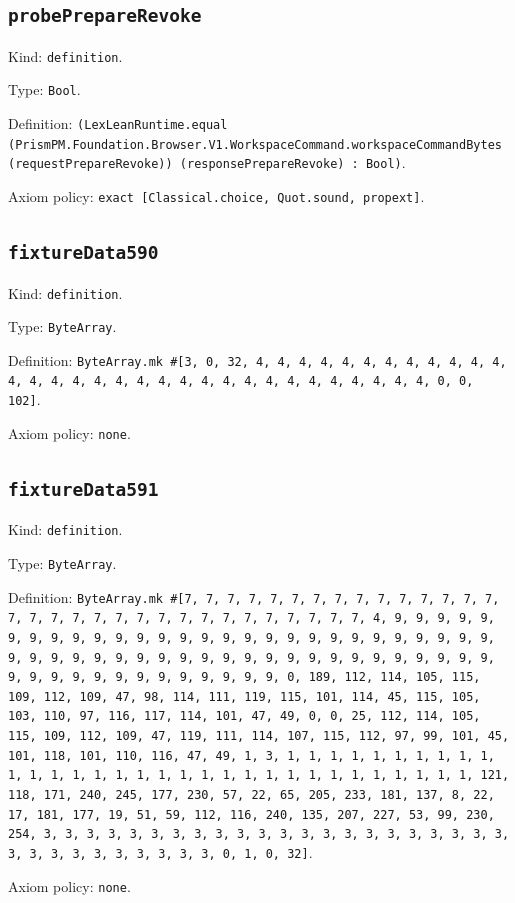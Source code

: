 \documentclass[11pt]{article}
\begin{document}
\subsection*{\texttt{probePrepareRevoke}}
\noindent Kind: \texttt{definition}.\par
\noindent Type: \texttt{Bool}.\par
\noindent Definition: \texttt{(LexLeanRuntime.equal (PrismPM.Foundation.Browser.V1.WorkspaceCommand.workspaceCommandBytes (requestPrepareRevoke)) (responsePrepareRevoke) : Bool)}.\par
\noindent Axiom policy: \texttt{exact [Classical.choice, Quot.sound, propext]}.\par
\subsection*{\texttt{fixtureData590}}
\noindent Kind: \texttt{definition}.\par
\noindent Type: \texttt{ByteArray}.\par
\noindent Definition: \texttt{ByteArray.mk \#[3, 0, 32, 4, 4, 4, 4, 4, 4, 4, 4, 4, 4, 4, 4, 4, 4, 4, 4, 4, 4, 4, 4, 4, 4, 4, 4, 4, 4, 4, 4, 4, 4, 4, 4, 0, 0, 102]}.\par
\noindent Axiom policy: \texttt{none}.\par
\subsection*{\texttt{fixtureData591}}
\noindent Kind: \texttt{definition}.\par
\noindent Type: \texttt{ByteArray}.\par
\noindent Definition: \texttt{ByteArray.mk \#[7, 7, 7, 7, 7, 7, 7, 7, 7, 7, 7, 7, 7, 7, 7, 7, 7, 7, 7, 7, 7, 7, 7, 7, 7, 7, 7, 7, 7, 7, 7, 7, 4, 9, 9, 9, 9, 9, 9, 9, 9, 9, 9, 9, 9, 9, 9, 9, 9, 9, 9, 9, 9, 9, 9, 9, 9, 9, 9, 9, 9, 9, 9, 9, 9, 9, 9, 9, 9, 9, 9, 9, 9, 9, 9, 9, 9, 9, 9, 9, 9, 9, 9, 9, 9, 9, 9, 9, 9, 9, 9, 9, 9, 9, 9, 9, 9, 0, 189, 112, 114, 105, 115, 109, 112, 109, 47, 98, 114, 111, 119, 115, 101, 114, 45, 115, 105, 103, 110, 97, 116, 117, 114, 101, 47, 49, 0, 0, 25, 112, 114, 105, 115, 109, 112, 109, 47, 119, 111, 114, 107, 115, 112, 97, 99, 101, 45, 101, 118, 101, 110, 116, 47, 49, 1, 3, 1, 1, 1, 1, 1, 1, 1, 1, 1, 1, 1, 1, 1, 1, 1, 1, 1, 1, 1, 1, 1, 1, 1, 1, 1, 1, 1, 1, 1, 1, 1, 1, 121, 118, 171, 240, 245, 177, 230, 57, 22, 65, 205, 233, 181, 137, 8, 22, 17, 181, 177, 19, 51, 59, 112, 116, 240, 135, 207, 227, 53, 99, 230, 254, 3, 3, 3, 3, 3, 3, 3, 3, 3, 3, 3, 3, 3, 3, 3, 3, 3, 3, 3, 3, 3, 3, 3, 3, 3, 3, 3, 3, 3, 3, 3, 3, 0, 1, 0, 32]}.\par
\noindent Axiom policy: \texttt{none}.\par
\end{document}
